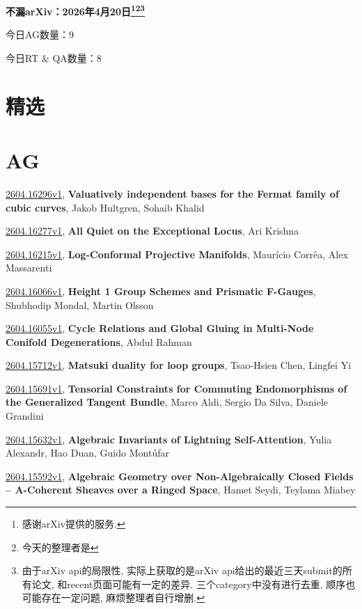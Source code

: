 \documentclass[9pt, a4paper]{article}
\theoremstyle{plain}
\theoremstyle{definition}
\theoremstyle{remark}
\newcommand{\arxiv}[3]{\href{https://arxiv.org/abs/#1}{#1}, \textbf{\textcolor{arxivblue}{#2}}, #3}
\newcommand{\AGnumber}{9}
\newcommand{\RTQAnumber}{8}
\newcommand{\NewestDate}{2026年4月20日}
\newcommand{\todayarXiver}{} %
\begin{document}
\begin{center}
    \Huge\textbf{不漏arXiv：\NewestDate\footnote{感谢arXiv提供的服务.}\footnote{今天的整理者是\todayarXiver}\footnote{由于arXiv api的局限性, 实际上获取的是arXiv api给出的最近三天submit的所有论文, 和recent页面可能有一定的差异. 三个category中没有进行去重, 顺序也可能存在一定问题, 麻烦整理者自行增删.}} \\
\end{center}

\setcounter{section}{-1}

\begin{center}
    今日AG数量：\AGnumber
    
    今日RT \& QA数量：\RTQAnumber
    
\end{center}


\section{精选}


\section{AG}
\arxiv{2604.16296v1}{Valuatively independent bases for the Fermat family of cubic curves}{Jakob Hultgren, Sohaib Khalid}

\arxiv{2604.16277v1}{All Quiet on the Exceptional Locus}{Ari Krishna}

\arxiv{2604.16215v1}{Log-Conformal Projective Manifolds}{Maurício Corrêa, Alex Massarenti}

\arxiv{2604.16066v1}{Height 1 Group Schemes and Prismatic F-Gauges}{Shubhodip Mondal, Martin Olsson}

\arxiv{2604.16055v1}{Cycle Relations and Global Gluing in Multi-Node Conifold Degenerations}{Abdul Rahman}

\arxiv{2604.15712v1}{Matsuki duality for loop groups}{Tsao-Hsien Chen, Lingfei Yi}

\arxiv{2604.15691v1}{Tensorial Constraints for Commuting Endomorphisms of the Generalized Tangent Bundle}{Marco Aldi, Sergio Da Silva, Daniele Grandini}

\arxiv{2604.15632v1}{Algebraic Invariants of Lightning Self-Attention}{Yulia Alexandr, Hao Duan, Guido Montúfar}

\arxiv{2604.15592v1}{Algebraic Geometry over Non-Algebraically Closed Fields -- A-Coherent Sheaves over a Ringed Space}{Hamet Seydi, Teylama Miabey}
\end{document}
